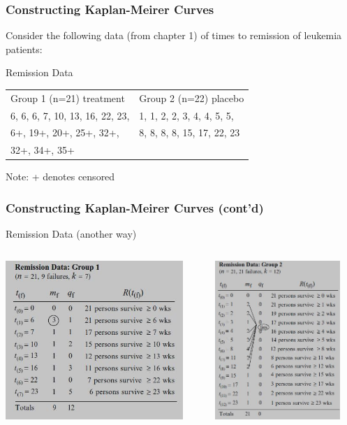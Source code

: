 \documentclass{beamer}
\theoremstyle{definition}
\begin{document}
\begin{frame}
\frametitle{Constructing Kaplan-Meirer Curves}
Consider the following data (from chapter 1) of times to remission of leukemia patients:
\begin{block}{Remission Data }
\begin{table}
\begin{center}
\begin{tabular}{l l}
Group 1 (n=21) treatment & Group 2 (n=22) placebo \\
 6, 6, 6, 7, 10, 13, 16, 22, 23, & 1, 1, 2, 2, 3, 4, 4, 5, 5,  \\
 6+, 19+, 20+, 25+, 32+,& 8, 8, 8, 8, 15, 17, 22, 23 \\
  32+, 34+, 35+ &
\end{tabular}
\end{center}
\end{table}
Note: + denotes censored
\end{block}
\end{frame}

\begin{frame}
\frametitle{Constructing Kaplan-Meirer Curves (cont'd)}
\begin{block}{Remission Data (another way)}
\begin{columns}
    \begin{column}{0.48\textwidth}
        \includegraphics[width =\textwidth, height=6cm]{Ch1-leuk_data_a1.JPG}
    \end{column}
    \hspace{-10pt}
    \begin{column}{0.48\textwidth}
         \includegraphics[width =\textwidth, height=6cm]{Ch1-leuk_data_b1.JPG}
    \end{column}
\end{columns}
\end{block}
\end{frame}
\end{document}
